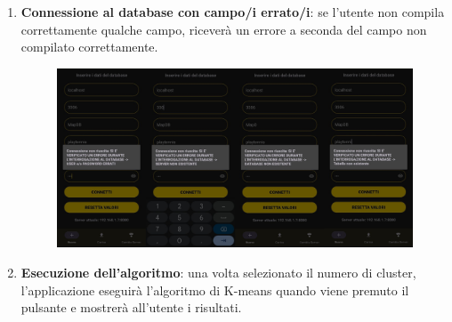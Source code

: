 \begin{enumerate}
\begin{figure}[H]
    \end{figure}
  \item \textbf{Connessione al database con campo/i errato/i}: se l'utente non compila correttamente qualche campo, riceverà un errore a seconda del campo non compilato correttamente.
    \begin{figure}[H]
      \centering
      \includegraphics[scale=0.27]{img/app6.png}
    \end{figure}
  \item \textbf{Esecuzione dell'algoritmo}: una volta selezionato il numero di cluster, l'applicazione eseguirà l'algoritmo di K-means quando viene premuto il pulsante e mostrerà all'utente i risultati. 
  \begin{figure}[H]
    \centering

\end{figure}
\end{enumerate}
